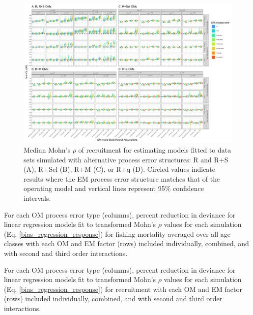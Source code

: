 \documentclass[
  12pt,
]{article}
\begin{document}
\begin{landscape}
\begin{figure}
\begin{center}
\includegraphics[width = 1.4\textwidth]{mohns_rho_R_plots}
\end{center}
\caption{Median Mohn's $\rho$ of recruitment for estimating models fitted to data sets simulated with alternative process error structures: R and R+S (A), R+Sel (B), R+M (C), or R+q (D). Circled values indicate results where the EM process error structure matches that of the operating model and vertical lines represent 95\% confidence intervals.}\label{mohns_rho_R}
\end{figure}
\end{landscape}

\begin{table}
\caption{For each OM process error type (columns), percent reduction in deviance for linear regression models fit to transformed Mohn's $\rho$ values for each simulation (Eq. \ref{bias_regression_response}) for fishing mortality averaged over all age classes with each OM and EM factor (rows) included individually, combined, and with second and third order interactions.}\label{mohns_rho_F_PRD_table}
{}
\end{table}

\begin{table}
\caption{For each OM process error type (columns), percent reduction in deviance for linear regression models fit to transformed Mohn's $\rho$ values for each simulation (Eq. \ref{bias_regression_response}) for recruitment with each OM and EM factor (rows) included individually, combined, and with second and third order interactions.}\label{mohns_rho_R_PRD_table}
{}
\end{table}
\end{document}

